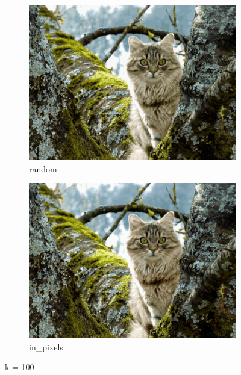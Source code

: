 \documentclass{article}
\begin{document}
\begin{figure}[ht!]
  \begin{subfigure}{.5\textwidth}
    \centering
    \includegraphics[width=.8\linewidth]{image/random_100.png}
    \caption{random}
    \label{fig:sfig7}
  \end{subfigure}%
  \begin{subfigure}{.5\textwidth}
    \centering
    \includegraphics[width=.8\linewidth]{image/in_100.png}
    \caption{in\_pixels}
    \label{fig:sfig8}
  \end{subfigure}
  \caption{k = 100}
  \label{fig:fig3}
\end{figure}
\end{document}
